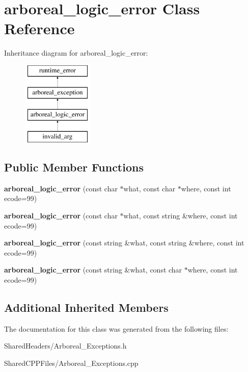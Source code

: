 \hypertarget{classarboreal__logic__error}{}\section{arboreal\+\_\+logic\+\_\+error Class Reference}
\label{classarboreal__logic__error}
Inheritance diagram for arboreal\+\_\+logic\+\_\+error\+:\begin{figure}[H]
\begin{center}
\leavevmode
\includegraphics[height=4.000000cm]{classarboreal__logic__error}
\end{center}
\end{figure}
\subsection*{Public Member Functions}
\begin{DoxyCompactItemize}
\item 
\mbox{\label{classarboreal__logic__error_aaea786c69fe107f9b6753b51001c59d6}} 
{\bfseries arboreal\+\_\+logic\+\_\+error} (const char $\ast$what, const char $\ast$where, const int ecode=99)
\item 
\mbox{\label{classarboreal__logic__error_a70b8217c9841efc9bb1e556282a89fe0}} 
{\bfseries arboreal\+\_\+logic\+\_\+error} (const char $\ast$what, const string \&where, const int ecode=99)
\item 
\mbox{\label{classarboreal__logic__error_ad7627c19a966b137cf018aa7c3075421}} 
{\bfseries arboreal\+\_\+logic\+\_\+error} (const string \&what, const string \&where, const int ecode=99)
\item 
\mbox{\label{classarboreal__logic__error_a5c589df18299902a24dae25f8a25c02a}} 
{\bfseries arboreal\+\_\+logic\+\_\+error} (const string \&what, const char $\ast$where, const int ecode=99)
\end{DoxyCompactItemize}
\subsection*{Additional Inherited Members}


The documentation for this class was generated from the following files\+:\begin{DoxyCompactItemize}
\item 
Shared\+Headers/Arboreal\+\_\+\+Exceptions.\+h\item 
Shared\+C\+P\+P\+Files/Arboreal\+\_\+\+Exceptions.\+cpp\end{DoxyCompactItemize}

